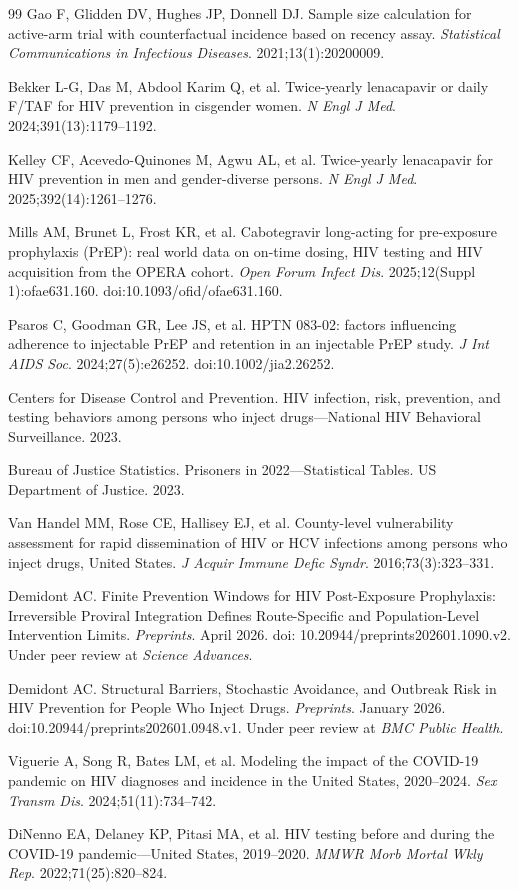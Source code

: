 \documentclass[11pt]{article}
\begin{document}
\begin{thebibliography}{99}
\small
{} Gao F, Glidden DV, Hughes JP, Donnell DJ. Sample size calculation for active-arm trial with counterfactual incidence based on recency assay. \emph{Statistical Communications in Infectious Diseases}. 2021;13(1):20200009.

 Bekker L-G, Das M, Abdool Karim Q, et al. Twice-yearly lenacapavir or daily F/TAF for HIV prevention in cisgender women. \emph{N Engl J Med}. 2024;391(13):1179--1192.

 Kelley CF, Acevedo-Quinones M, Agwu AL, et al. Twice-yearly lenacapavir for HIV prevention in men and gender-diverse persons. \emph{N Engl J Med}. 2025;392(14):1261--1276.

 Mills AM, Brunet L, Frost KR, et al. Cabotegravir long-acting for pre-exposure prophylaxis (PrEP): real world data on on-time dosing, HIV testing and HIV acquisition from the OPERA cohort. \emph{Open Forum Infect Dis}. 2025;12(Suppl 1):ofae631.160. doi:10.1093/ofid/ofae631.160.

 Psaros C, Goodman GR, Lee JS, et al. HPTN 083-02: factors influencing adherence to injectable PrEP and retention in an injectable PrEP study. \emph{J Int AIDS Soc}. 2024;27(5):e26252. doi:10.1002/jia2.26252.

 Centers for Disease Control and Prevention. HIV infection, risk, prevention, and testing behaviors among persons who inject drugs---National HIV Behavioral Surveillance. 2023.

 Bureau of Justice Statistics. Prisoners in 2022---Statistical Tables. US Department of Justice. 2023.

 Van Handel MM, Rose CE, Hallisey EJ, et al. County-level vulnerability assessment for rapid dissemination of HIV or HCV infections among persons who inject drugs, United States. \emph{J Acquir Immune Defic Syndr}. 2016;73(3):323--331.

 Demidont AC. Finite Prevention Windows for HIV Post-Exposure Prophylaxis: Irreversible Proviral Integration Defines Route-Specific and Population-Level Intervention Limits. \emph{Preprints}. April 2026. doi: 10.20944/preprints202601.1090.v2. Under peer review at \emph{Science Advances}.

 Demidont AC. Structural Barriers, Stochastic Avoidance, and Outbreak Risk in HIV Prevention for People Who Inject Drugs. \emph{Preprints}. January 2026. doi:10.20944/preprints202601.0948.v1. Under peer review at \emph{BMC Public Health}.

 Viguerie A, Song R, Bates LM, et al. Modeling the impact of the COVID-19 pandemic on HIV diagnoses and incidence in the United States, 2020--2024. \textit{Sex Transm Dis}. 2024;51(11):734--742.

 DiNenno EA, Delaney KP, Pitasi MA, et al. HIV testing before and during the COVID-19 pandemic---United States, 2019--2020. \textit{MMWR Morb Mortal Wkly Rep}. 2022;71(25):820--824.\end{thebibliography}
\end{document}
